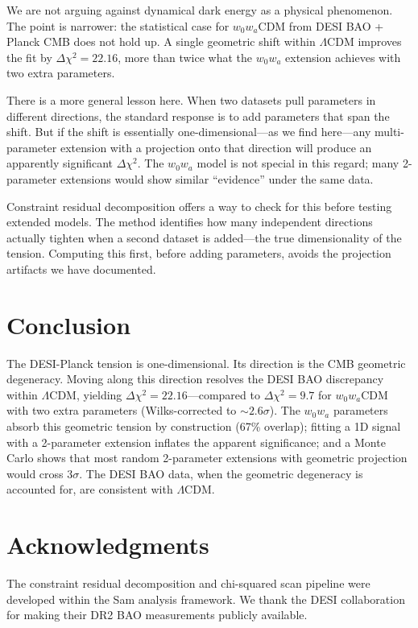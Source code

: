 \documentclass[12pt,preprint]{aastex631}
\begin{document}
We are not arguing against dynamical dark energy as a physical phenomenon. The point is narrower: the statistical case for $w_0 w_a$CDM from DESI BAO + Planck CMB does not hold up. A single geometric shift within $\Lambda$CDM improves the fit by $\Delta\chi^2=22.16$, more than twice what the $w_0 w_a$ extension achieves with two extra parameters.

There is a more general lesson here. When two datasets pull parameters in different directions, the standard response is to add parameters that span the shift. But if the shift is essentially one-dimensional---as we find here---any multi-parameter extension with a projection onto that direction will produce an apparently significant $\Delta\chi^2$. The $w_0 w_a$ model is not special in this regard; many 2-parameter extensions would show similar ``evidence'' under the same data.

Constraint residual decomposition offers a way to check for this before testing extended models. The method identifies how many independent directions actually tighten when a second dataset is added---the true dimensionality of the tension. Computing this first, before adding parameters, avoids the projection artifacts we have documented.

\section{Conclusion}
\label{sec:conclusion}

The DESI-Planck tension is one-dimensional. Its direction is the CMB geometric degeneracy. Moving along this direction resolves the DESI BAO discrepancy within $\Lambda$CDM, yielding $\Delta\chi^2 = 22.16$---compared to $\Delta\chi^2 = 9.7$ for $w_0 w_a$CDM with two extra parameters (Wilks-corrected to $\sim 2.6\sigma$). The $w_0 w_a$ parameters absorb this geometric tension by construction (67\% overlap); fitting a 1D signal with a 2-parameter extension inflates the apparent significance; and a Monte Carlo shows that most random 2-parameter extensions with geometric projection would cross $3\sigma$. The DESI BAO data, when the geometric degeneracy is accounted for, are consistent with $\Lambda$CDM.

\section*{Acknowledgments}

The constraint residual decomposition and chi-squared scan pipeline were developed within the Sam analysis framework. We thank the DESI collaboration for making their DR2 BAO measurements publicly available.
\end{document}
